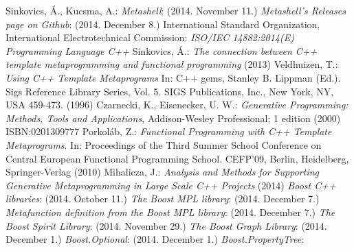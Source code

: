 
\begin{thebibliography}{99}
    Sinkovics, Á., Kucsma, A.:
    \textit{Metashell}:
     (2014. November 11.)
    \textit{Metashell's Releases page on Github}:
     (2014. December 8.)
    International Standard Organization, International Electrotechnical
    Commission: \textit{ISO/IEC 14882:2014(E) Programming Language C++}
    Sinkovics, Á.:
    \textit{The connection between C++ template metaprogramming and functional
    programming} (2013)
    Veldhuizen, T.:
    \textit{Using C++ Template Metaprograms} In: C++ gems, Stanley B. Lippman
    (Ed.). Sigs Reference Library Series, Vol. 5. SIGS Publications, Inc.,
    New York, NY, USA 459-473. (1996)
    Czarnecki, K., Eisenecker, U. W.:
    \textit{Generative Programming: Methods, Tools and Applications},
    Addison-Wesley Professional; 1 edition (2000) ISBN:0201309777
    Porkoláb, Z.:
    \textit{Functional Programming with C++ Template Metaprograms}.
    In: Proceedings of the Third Summer School Conference on
    Central European Functional Programming School. CEFP’09, Berlin,
    Heidelberg, Springer-Verlag (2010)
    Mihalicza, J.:
    \textit{Analysis and Methods for Supporting Generative Metaprogramming in
    Large Scale C++ Projects} (2014)
    \textit{Boost C++ libraries}:
     (2014. October 11.)
    \textit{The Boost MPL library}:
    (2014. December 7.)
    \textit{Metafunction definition from the Boost MPL library}:
    (2014. December 7.)
    \textit{The Boost Spirit Library}:
     (2014. November 29.)
    \textit{The Boost Graph Library}:
    (2014. December 1.)
    \textit{Boost.Optional}:
    (2014. December 1.)
    \textit{Boost.PropertyTree}:

\end{thebibliography}
